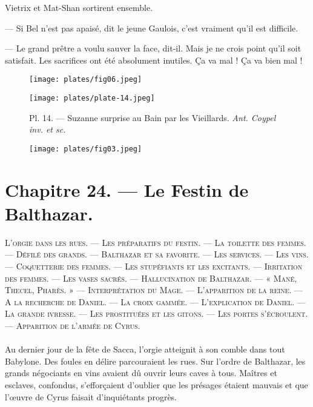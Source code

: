 \documentclass[a4paper, 11pt, oneside, polutonikogreek, french]{article}
\begin{document}
Vietrix et Mat-Shan sortirent ensemble.

--- Si Bel n'est pas apaisé, dit le jeune Gaulois, c'est vraiment qu'il est difficile.

--- Le grand prêtre a voulu sauver la face, dit-il. Mais je ne crois point qu'il soit satisfait. Les sacrifices ont été absolument inutiles. Ça va mal ! Ça va bien mal !

\begin{figure}[H]
\centering
\texttt{[image: plates/fig06.jpeg]}
\end{figure}
\clearpage
\begin{landscape}
\begin{figure}[H]
\centering
\texttt{[image: plates/plate-14.jpeg]}
\caption{\Fontauri Pl. 14. --- Suzanne surprise au Bain par les Vieillards. \emph{Ant. Coypel inv. et sc.}}
\end{figure}
\end{landscape}
\clearpage
\begin{figure}[H]
\centering
\texttt{[image: plates/fig03.jpeg]}
\end{figure}
\section{Chapitre 24. --- Le Festin de Balthazar.}
\begin{center}
\scshape
\small
L'orgie dans les rues. --- Les préparatifs du festin. --- La toilette des femmes. --- Défilé des grands. --- Balthazar et sa favorite. --- Les services. --- Les vins. --- Coquetterie des femmes. --- Les stupéfiants et les excitants. --- Irritation des femmes. --- Les vases sacrés. --- Hallucination de Balthazar. --- « Mané, Thecel, Pharès. » --- Interprétation du Mage. --- L'apparition de la reine. --- A la recherche de Daniel. --- La croix gammée. --- L'explication de Daniel. --- La grande ivresse. --- Les prostituées et les gitons. --- Les portes s'écroulent. --- Apparition de l'armée de Cyrus.
\end{center}
\paragraph{}
Au dernier jour de la fête de Sacca, l'orgie atteignit à son comble dans tout Babylone. Des foules en délire parcouraient les rues. Sur l'ordre de Balthazar, les grands négociants en vins avaient dû ouvrir leurs caves à tous. Maîtres et esclaves, confondus, s'efforçaient d'oublier que les présages étaient mauvais et que l'œuvre de Cyrus faisait d'inquiétants progrès.
\end{document}

